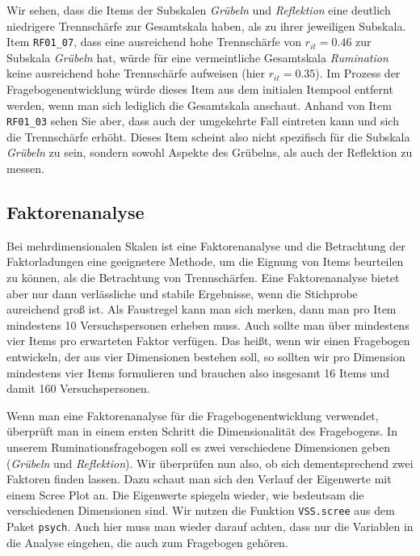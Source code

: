 \documentclass[
  ngerman,
]{book}
\begin{document}
Wir sehen, dass die Items der Subskalen \emph{Grübeln} und \emph{Reflektion} eine deutlich niedrigere Trennschärfe zur Gesamtskala haben, als zu ihrer jeweiligen Subskala. Item \texttt{RF01\_07}, dass eine ausreichend hohe Trennschärfe von \(r_{it} = 0.46\) zur Subskala \emph{Grübeln} hat, würde für eine vermeintliche Gesamtskala \emph{Rumination} keine ausreichend hohe Trennschärfe aufweisen (hier \(r_{it} = 0.35\)). Im Prozess der Fragebogenentwicklung würde dieses Item aus dem initialen Itempool entfernt werden, wenn man sich lediglich die Gesamtskala anschaut. Anhand von Item \texttt{RF01\_03} sehen Sie aber, dass auch der umgekehrte Fall eintreten kann und sich die Trennschärfe erhöht. Dieses Item scheint also nicht spezifisch für die Subskala \emph{Grübeln} zu sein, sondern sowohl Aspekte des Grübelns, als auch der Reflektion zu messen.

\subsection{Faktorenanalyse}\label{faktorenanalyse}

Bei mehrdimensionalen Skalen ist eine Faktorenanalyse und die Betrachtung der Faktorladungen eine geeignetere Methode, um die Eignung von Items beurteilen zu können, als die Betrachtung von Trennschärfen. Eine Faktorenanalyse bietet aber nur dann verlässliche und stabile Ergebnisse, wenn die Stichprobe aureichend groß ist. Als Faustregel kann man sich merken, dann man pro Item mindestens 10 Versuchspersonen erheben muss. Auch sollte man über mindestens vier Items pro erwarteten Faktor verfügen. Das heißt, wenn wir einen Fragebogen entwickeln, der aus vier Dimensionen bestehen soll, so sollten wir pro Dimension mindestens vier Items formulieren und brauchen also insgesamt 16 Items und damit 160 Versuchspersonen.

Wenn man eine Faktorenanalyse für die Fragebogenentwicklung verwendet, überprüft man in einem ersten Schritt die Dimensionalität des Fragebogens. In unserem Ruminationsfragebogen soll es zwei verschiedene Dimensionen geben (\emph{Grübeln} und \emph{Reflektion}). Wir überprüfen nun also, ob sich dementsprechend zwei Faktoren finden lassen. Dazu schaut man sich den Verlauf der Eigenwerte mit einem Scree Plot an. Die Eigenwerte spiegeln wieder, wie bedeutsam die verschiedenen Dimensionen sind. Wir nutzen die Funktion \texttt{VSS.scree} aus dem Paket \texttt{psych}. Auch hier muss man wieder darauf achten, dass nur die Variablen in die Analyse eingehen, die auch zum Fragebogen gehören.
\end{document}
